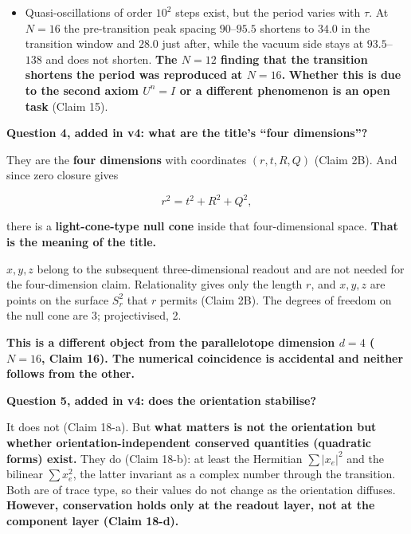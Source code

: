 \documentclass[
  10pt,
]{article}
\begin{document}
\begin{itemize}
{  do exist}: at least the two kinds \(\sum_e\lvert x_e\rvert^2\) and
  \(\sum_e x_e^2\), both of trace type and hence unaffected by the
  diffusion of orientation. In particular \(\sum_e x_e^2\) is
  \textbf{invariant as a complex number through the transition} (Claim
  18).
\item
  Quasi-oscillations of order \(10^2\) steps exist, but the period
  varies with \(\tau\). At \(N=16\) the pre-transition peak spacing
  \(90\)--\(95.5\) shortens to \(34.0\) in the transition window and
  \(28.0\) just after, while the vacuum side stays at \(93.5\)--\(138\)
  and does not shorten. \textbf{The \(N=12\) finding that the transition
  shortens the period was reproduced at \(N=16\).} \textbf{Whether this
  is due to the second axiom \(U^n=I\) or a different phenomenon is an
  open task} (Claim 15).
\end{itemize}

\textbf{Question 4, added in v4: what are the title's ``four
dimensions''?}

They are the \textbf{four dimensions} with coordinates \((r,t,R,Q)\)
(Claim 2B). And since zero closure gives

\[r^2 = t^2 + R^2 + Q^2,\]

there is a \textbf{light-cone-type null cone} inside that
four-dimensional space. \textbf{That is the meaning of the title.}

\(x,y,z\) belong to the subsequent three-dimensional readout and are not
needed for the four-dimension claim. Relationality gives only the length
\(r\), and \(x,y,z\) are points on the surface \(S_r^2\) that \(r\)
permits (Claim 2B). The degrees of freedom on the null cone are 3;
projectivised, 2.

\textbf{This is a different object from the parallelotope dimension
\(d=4\) (\(N=16\), Claim 16). The numerical coincidence is accidental
and neither follows from the other.}

\textbf{Question 5, added in v4: does the orientation stabilise?}

It does not (Claim 18-a). But \textbf{what matters is not the
orientation but whether orientation-independent conserved quantities
(quadratic forms) exist.} They do (Claim 18-b): at least the Hermitian
\(\sum\lvert x_e\rvert^2\) and the bilinear \(\sum x_e^2\), the latter
invariant as a complex number through the transition. Both are of trace
type, so their values do not change as the orientation diffuses.
\textbf{However, conservation holds only at the readout layer, not at
the component layer (Claim 18-d).}
\end{document}
